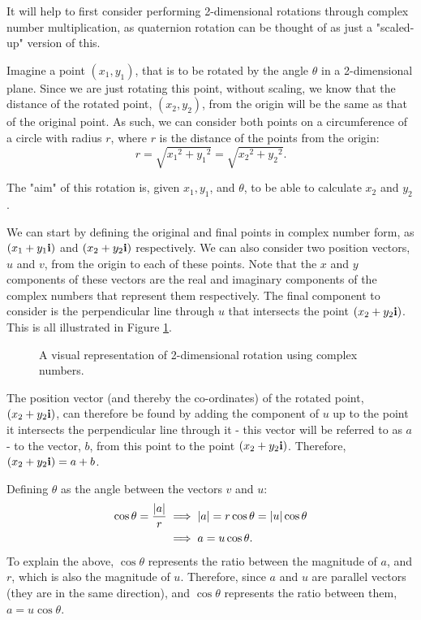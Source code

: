 \documentclass[10pt]{article}
\begin{document}
It will help to first consider performing 2-dimensional rotations \cite{ComplexRotation} through complex number multiplication, as quaternion rotation can be thought of as just a "scaled-up" version of this.

Imagine a point $(x_1, y_1)$, that is to be rotated by the angle $\theta$ in a 2-dimensional plane. Since we are just rotating this point, without scaling, we know that the distance of the rotated point, $(x_2, y_2)$, from the origin will be the same as that of the original point. As such, we can consider both points on a circumference of a circle with radius $r$, where $r$ is the distance of the points from the origin:
\begin{equation}
    r = \sqrt{{x_1}^2 + {y_1}^2} = \sqrt{{x_2}^2 + {y_2}^2}.
\end{equation}

The "aim" of this rotation is, given $x_1, y_1$, and $\theta$, to be able to calculate $x_2$ and $y_2$.

We can start by defining the original and final points in complex number form, as $(x_1 + y_1\vb{i})$ and $(x_2 + y_2\vb{i})$ respectively. We can also consider two position vectors, $u$ and $v$, from the origin to each of these points. Note that the $x$ and $y$ components of these vectors are the real and imaginary components of the complex numbers that represent them respectively. The final component to consider is the perpendicular line through $u$ that intersects the point $(x_2 + y_2\vb{i})$. This is all illustrated in Figure \ref{ComplexRotationFig}.

\begin{figure}[ht]
    \centering
    \caption{A visual representation of 2-dimensional rotation using complex numbers.}
    \label{ComplexRotationFig}
\end{figure}

The position vector (and thereby the co-ordinates) of the rotated point, $(x_2 + y_2\vb{i})$, can therefore be found by adding the component of $u$ up to the point it intersects the perpendicular line through it - this vector will be referred to as $a$ - to the vector, $b$, from this point to the point $(x_2 + y_2\vb{i})$. Therefore, $(x_2 + y_2\vb{i}) = a + b$.

Defining $\theta$ as the angle between the vectors $v$ and $u$:
\begin{equation}
    \begin{aligned}
        \cos\theta = \frac{\abs{a}}{r} &\implies \abs{a} = r\cos\theta = \abs{u}\cos\theta \\
        &\implies a = u\cos\theta.
    \end{aligned}
\end{equation}
To explain the above, $\cos\theta$ represents the ratio between the magnitude of $a$, and $r$, which is also the magnitude of $u$. Therefore, since $a$ and $u$ are parallel vectors (they are in the same direction), and $\cos\theta$ represents the ratio between them, $a = u\cos\theta$.
\end{document}
